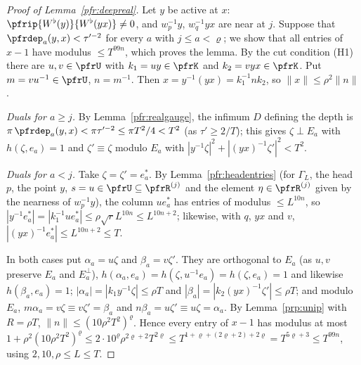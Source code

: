 \documentclass[10pt]{amsart}
\theoremstyle{definition}
\theoremstyle{remark}
\begin{document}
\begin{proof}[Proof of Lemma~\ref{pfr:deepreal}]
Let $y$ be active at $x$: $\pfrip{W^\flat(y)}{W^\flat(yx)}\ne0$, and $w_p^{-1}y$, $w_q^{-1}yx$ are near at $j$.
Suppose that $\pfrdep_a(y,x)<\tau'^{-2}$ for every $a$ with $j\le a<\varrho$; we show that all entries of $x-1$
have modulus $\le T^{99n}$, which proves the lemma. By the cut condition (H1) there are $u,v\in\pfrU$ with
$k_1=uy\in\pfrK$ and $k_2=vyx\in\pfrK$. Put $m=vu^{-1}\in\pfrU$, $n=m^{-1}$. Then $x=y^{-1}(yx)=k_1^{-1}nk_2$, so
$\|x\|\le\rho^2\|n\|$.

\emph{Duals for $a\ge j$.} By Lemma~\ref{pfr:realgauge}, the infimum $D$ defining the depth is $\pi\,\pfrdep_a(y,x)<\pi\tau'^{-2}\le\pi T^2/4<T^2$
(as $\tau'\ge2/T$); this gives $\zeta\perp E_a$ with $h(\zeta,e_a)=1$ and $\zeta'\equiv\zeta$ modulo $E_a$ with
$|y^{-1}\zeta|^2+|(yx)^{-1}\zeta'|^2<T^2$.

\emph{Duals for $a<j$.} Take $\zeta=\zeta'=e_a^*$. By Lemma~\ref{pfr:headentries} (for $\Gamma_L$, the head $p$,
the point $y$, $s=u\in\pfrU\subseteq\pfrR^{(j)}$ and the element $\eta\in\pfrR^{(j)}$ given by the nearness of
$w_p^{-1}y$), the column $ue_a^*$ has entries of modulus $\le L^{10n}$, so $|y^{-1}e_a^*|=|k_1^{-1}ue_a^*|\le
\rho\sqrt rL^{10n}\le L^{10n+2}$; likewise, with $q$, $yx$ and $v$, $|(yx)^{-1}e_a^*|\le L^{10n+2}\le T$.

In both cases put $\alpha_a=u\zeta$ and $\beta_a=v\zeta'$. They are orthogonal to $E_a$ (as $u,v$ preserve $E_a$
and $E_a^\perp$), $h(\alpha_a,e_a)=h(\zeta,u^{-1}e_a)=h(\zeta,e_a)=1$ and likewise $h(\beta_a,e_a)=1$;
$|\alpha_a|=|k_1y^{-1}\zeta|\le\rho T$ and $|\beta_a|=|k_2(yx)^{-1}\zeta'|\le\rho T$; and modulo $E_a$,
$m\alpha_a=v\zeta\equiv v\zeta'=\beta_a$ and $n\beta_a=u\zeta'\equiv u\zeta=\alpha_a$. By Lemma~\ref{prp:unip} with
$R=\rho T$, $\|n\|\le(10\rho^2T^2)^\varrho$. Hence every entry of $x-1$ has modulus at most
$1+\rho^2(10\rho^2T^2)^\varrho\le2\cdot10^\varrho\rho^{2\varrho+2}T^{2\varrho}\le T^{1+\varrho+(2\varrho+2)+2\varrho}=T^{5\varrho+3}\le
T^{99n}$, using $2,10,\rho\le L\le T$.
\end{proof}
\end{document}
